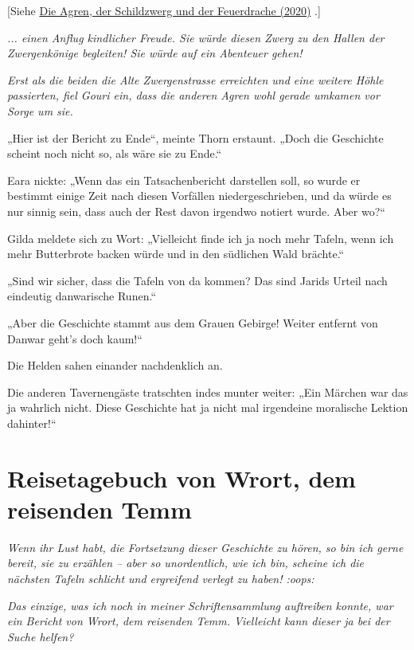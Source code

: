 \documentclass[10pt, a4paper, oneside]{book}
\newcommand{\hypref}[1]{%
    \hyperref[#1]{#1}%
}
\begin{document}
[Siehe \hypref{Die Agren, der Schildzwerg und der Feuerdrache (2020)}.]

\textit{... einen Anflug kindlicher Freude. Sie würde diesen Zwerg zu den Hallen der Zwergenkönige begleiten! Sie würde auf ein Abenteuer gehen!}

\textit{Erst als die beiden die Alte Zwergenstrasse erreichten und eine weitere Höhle passierten, fiel Gouri ein, dass die anderen Agren wohl gerade umkamen vor Sorge um sie.}\bigskip







„Hier ist der Bericht zu Ende“, meinte Thorn erstaunt. „Doch die Geschichte scheint noch nicht so, als wäre sie zu Ende.“

Eara nickte: „Wenn das ein Tatsachenbericht darstellen soll, so wurde er bestimmt einige Zeit nach diesen Vorfällen niedergeschrieben, und da würde es nur sinnig sein, dass auch der Rest davon irgendwo notiert wurde. Aber wo?“

Gilda meldete sich zu Wort: „Vielleicht finde ich ja noch mehr Tafeln, wenn ich mehr Butterbrote backen würde und in den südlichen Wald brächte.“

„Sind wir sicher, dass die Tafeln von da kommen? Das sind Jarids Urteil nach eindeutig danwarische Runen.“

„Aber die Geschichte stammt aus dem Grauen Gebirge! Weiter entfernt von Danwar geht’s doch kaum!“

Die Helden sahen einander nachdenklich an.

Die anderen Tavernengäste tratschten indes munter weiter: „Ein Märchen war das ja wahrlich nicht. Diese Geschichte hat ja nicht mal irgendeine moralische Lektion dahinter!“


\newpage
\section{Reisetagebuch von Wrort, dem reisenden Temm}


\textit{Wenn ihr Lust habt, die Fortsetzung dieser Geschichte zu hören, so bin ich gerne bereit, sie zu erzählen – aber so unordentlich, wie ich bin, scheine ich die nächsten Tafeln schlicht und ergreifend verlegt zu haben! :oops:}

\textit{Das einzige, was ich noch in meiner Schriftensammlung auftreiben konnte, war ein Bericht von Wrort, dem reisenden Temm. Vielleicht kann dieser ja bei der Suche helfen?}\bigskip
\end{document}
